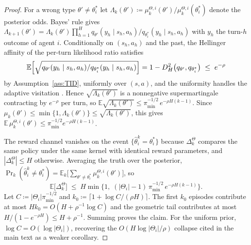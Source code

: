\begin{proof}
For a wrong type $\theta' \ne \theta_i^*$ let $\Lambda_k(\theta') \coloneqq \mu_k^{\Theta,i}(\theta') / \mu_k^{\Theta,i}(\theta_i^*)$ denote the posterior odds. Bayes' rule gives $\Lambda_{k+1}(\theta') = \Lambda_k(\theta') \prod_{h=1}^H q_{\theta'}(y_h \mid s_h, a_h)/q_{\theta_i^*}(y_h \mid s_h, a_h)$ with $y_h$ the turn-$h$ outcome of agent $i$. Conditionally on $(s_h, a_h)$ and the past, the Hellinger affinity of the per-turn likelihood ratio satisfies
\begin{equation*}\resizebox{0.85\linewidth}{!}{$\displaystyle \mathbb{E}\Big[\sqrt{q_{\theta'}(y_h \mid s_h,a_h)/q_{\theta_i^*}(y_h \mid s_h,a_h)}\Big] = 1 - D_H^2\big(q_{\theta'}, q_{\theta_i^*}\big) \;\le\; e^{-\rho} $}\end{equation*}
by Assumption~\ref{ass:TID}, uniformly over $(s,a)$, and the uniformity handles the adaptive visitation \citep{ghosal2017fundamentals}. Hence $\sqrt{\Lambda_k(\theta')}$ is a nonnegative supermartingale contracting by $e^{-\rho}$ per turn, so $\mathbb{E}\sqrt{\Lambda_k(\theta')} \le \pi_{\min}^{-1/2}\, e^{-\rho H (k-1)}$. Since $\mu_k(\theta') \le \min\{1, \Lambda_k(\theta')\} \le \sqrt{\Lambda_k(\theta')}$, this gives $\mathbb{E}\,\mu_k^{\Theta,i}(\theta') \le \pi_{\min}^{-1/2} e^{-\rho H(k-1)}$.

The reward channel vanishes on the event $\{\hat\theta_i^k = \theta_i^*\}$ because $\Delta_k^\Theta$ compares the same policy under the same kernel with identical reward parameters, and $|\Delta_k^\Theta| \le H$ otherwise. Averaging the truth over the posterior, $\Pr_k(\hat\theta_i^k \ne \theta_i^*) = \mathbb{E}_k\big[\sum_{\theta' \ne \theta_i^*} \mu_k^{\Theta,i}(\theta')\big]$, so
\begin{equation*}
\mathbb{E}\big[\Delta_k^\Theta\big] \;\le\; H \min\big\{1,\; (|\Theta_i|-1)\, \pi_{\min}^{-1/2}\, e^{-\rho H(k-1)}\big\}.
\end{equation*}
Let $C \coloneqq |\Theta_i|\pi_{\min}^{-1/2}$ and $k_0 \coloneqq \lceil 1 + \log C/(\rho H)\rceil$. The first $k_0$ episodes contribute at most $H k_0 = O(H + \rho^{-1}\log C)$ and the geometric tail contributes at most $H/(1 - e^{-\rho H}) \le H + \rho^{-1}$. Summing proves the claim. For the uniform prior, $\log C = O(\log|\Theta_i|)$, recovering the $O(H\log|\Theta_i|/\rho)$ collapse cited in the main text as a weaker corollary.
\end{proof}

